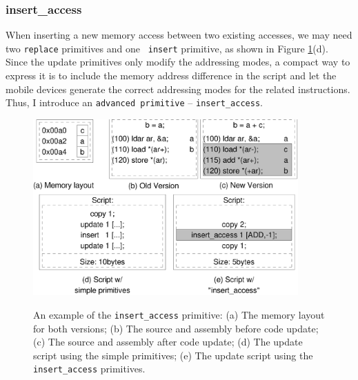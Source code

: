 

\subsubsection{insert\_access}

When inserting a new memory access between two existing accesses, we may need two {\tt replace} primitives and one {\tt 
insert} primitive, as shown in Figure \ref{insacc}(d). Since the update primitives only modify the addressing modes, a 
compact way to express it is to include the memory address difference in the script and let the mobile devices generate 
the correct addressing modes for the related instructions. Thus, I introduce an {\tt advanced primitive} -- 
{\tt insert\_access}.

\begin{figure}[htbp]
\begin{center}
\includegraphics[width=4in]{./figures/insacc.eps}
\caption[An example of the {\tt insert\_access} primitive.]{An example of the {\tt insert\_access} primitive:
(a) The memory layout for both versions;
(b) The source and assembly before code update;
(c) The  source and assembly after code update;
(d) The update script using the simple primitives;
(e) The update script using the {\tt insert\_access} primitives.
}
\vspace{-0.5in}
\label{insacc}
\end{center}
\end{figure}

